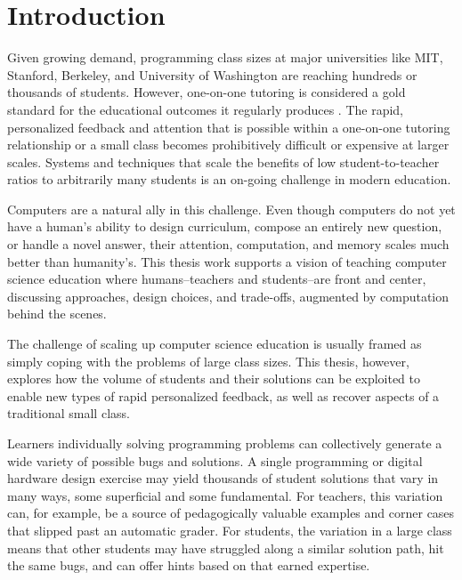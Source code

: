 \chapter{Introduction}\label{chapter:introduction}

Given growing demand, programming class sizes at major universities like MIT, Stanford, Berkeley, and University of Washington are reaching hundreds or thousands of students. However, one-on-one tutoring is considered a gold standard for the educational outcomes it regularly produces \cite{bloom}. The rapid, personalized feedback and attention that is possible within a one-on-one tutoring relationship or a small class becomes prohibitively difficult or expensive at larger scales. Systems and techniques that scale the benefits of low student-to-teacher ratios to arbitrarily many students is an on-going challenge in modern education.

Computers are a natural ally in this challenge. Even though computers do not yet have a human's ability to design curriculum, compose an entirely new question, or handle a novel answer, their attention, computation, and memory scales much better than humanity's. This thesis work supports a vision of teaching computer science education where humans--teachers and students--are front and center, discussing approaches, design choices, and trade-offs, augmented by computation behind the scenes.

The challenge of scaling up computer science education is usually framed as simply coping with the problems of large class sizes. This thesis, however, explores how the volume of students and their solutions can be exploited to enable new types of rapid personalized feedback, as well as recover aspects of a traditional small class.

Learners individually solving programming problems can collectively generate a wide variety of possible bugs and solutions. A single programming or digital hardware design exercise may yield thousands of student solutions that vary in many ways, some superficial and some fundamental. For teachers, this variation can, for example, be a source of pedagogically valuable examples and corner cases that slipped past an automatic grader. For students, the variation in a large class means that other students may have struggled along a similar solution path, hit the same bugs, and can offer hints based on that earned expertise. 

